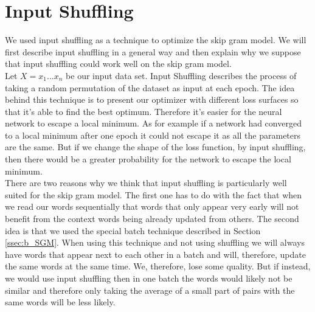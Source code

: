 \section{Input Shuffling}
We used input shuffling as a technique to optimize the skip gram model. We will first describe input shuffling in a general way and then explain why we suppose that input shuffling could work well on the skip gram model. \\
Let $X = {x_1...x_n}$ be our input data set. Input Shuffling describes the process of taking a random permutation of the dataset as input at each epoch. 
The idea behind this technique is to present our optimizer with different loss surfaces so that it's able to find the best optimum. Therefore it's easier for the neural network to escape a local minimum. As for example if a network had converged to a local minimum after one epoch it could not escape it as all the parameters are the same. But if we change the shape of the loss function, by input shuffling, then there would be a greater probability for the network to escape the local minimum.
\\
There are two reasons why we think that input shuffling is particularly well suited for the skip gram model. The first one has to do with the fact that when we read our words sequentially that words that only appear very early will not benefit from the context words being already updated from others. The second idea is that we used the special batch technique described in Section \ref{ssec:b_SGM}. When using this technique and not using shuffling we will always have words that appear next to each other in a batch and will, therefore, update the same words at the same time. We, therefore, lose some quality. But if instead, we would use input shuffling then in one batch the words would likely not be similar and therefore only taking the average of a small part of pairs with the same words will be less likely. 


